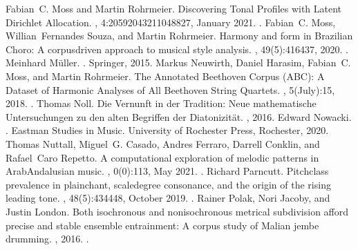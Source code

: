 \documentclass[letterpaper,10pt,english]{sphinxmanual}
\begin{document}
\begin{sphinxthebibliography}{10}
\sphinxAtStartPar
Fabian C. Moss and Martin Rohrmeier. Discovering Tonal Profiles with Latent Dirichlet Allocation. , 4:20592043211048827, January 2021. .
\sphinxAtStartPar
Fabian C. Moss, Willian Fernandes Souza, and Martin Rohrmeier. Harmony and form in Brazilian Choro: A corpus\sphinxhyphen{}driven approach to musical style analysis. , 49(5):416\textendash{}437, 2020. .
\sphinxAtStartPar
Meinhard Müller. . Springer, 2015.
\sphinxAtStartPar
Markus Neuwirth, Daniel Harasim, Fabian C. Moss, and Martin Rohrmeier. The Annotated Beethoven Corpus (ABC): A Dataset of Harmonic Analyses of All Beethoven String Quartets. , 5(July):1\textendash{}5, 2018. .
\sphinxAtStartPar
Thomas Noll. Die Vernunft in der Tradition: Neue mathematische Untersuchungen zu den alten Begriffen der Diatonizität. , 2016.
\sphinxAtStartPar
Edward Nowacki. . Eastman Studies in Music. University of Rochester Press, Rochester, 2020.
\sphinxAtStartPar
Thomas Nuttall, Miguel G. Casado, Andres Ferraro, Darrell Conklin, and Rafael Caro Repetto. A computational exploration of melodic patterns in Arab\sphinxhyphen{}Andalusian music. , 0(0):1\textendash{}13, May 2021. .
\sphinxAtStartPar
Richard Parncutt. Pitch\sphinxhyphen{}class prevalence in plainchant, scale\sphinxhyphen{}degree consonance, and the origin of the rising leading tone. , 48(5):434\textendash{}448, October 2019. .
\sphinxAtStartPar
Rainer Polak, Nori Jacoby, and Justin London. Both isochronous and non\sphinxhyphen{}isochronous metrical subdivision afford precise and stable ensemble entrainment: A corpus study of Malian jembe drumming. , 2016. .

\end{sphinxthebibliography}
\end{document}
